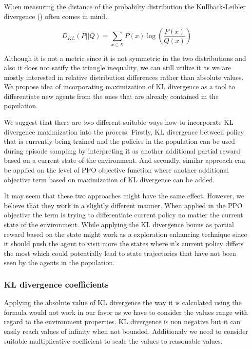 When measuring the distance of the probabilty distribution the Kullback-Leibler divergence (\cite{KLDivergence}) often comes in mind.

\[
    D_{KL}(P||Q) = \sum_{x \in X}P(x)\log\left(\frac{P(x)}{Q(x)}\right)
\]

Although it is not a metric since it is not symmetric in the two distributions and also it does not satify the triangle inequality, we can still utilize it as we are mostly interested in relative distribution differences rather than absolute values.
We propose idea of incorporating maximization of KL divergence as a tool to differentiate new agents from the ones that are already contained in the population.

We suggest that there are two different suitable ways how to incorporate KL divergence maximization into the process.
Firstly, KL divergence between policy that is currently being trained and the policies in the population can be used during episode sampling by interpreting it as another additional partial reward based on a current state of the environment.
And secondly, similar approach can be applied on the level of PPO objective function where another additional objective term based on maximization of KL divergence can be added.

It may seem that these two approaches might have the same effect.
However, we believe that they work in a slightly different manner.
When applied in the PPO objective the term is trying to differentiate current policy no matter the current state of the environment.
While applying the KL divergence bonus as partial reward based on the state might work as a exploration enhancing technique since it should push the agent to visit more the states where it's current policy differs the most which could potentially lead to state trajectories that have not been seen by the agents in the population.   

\subsubsection{KL divergence coefficients}
Applying the absolute value of KL divergence the way it is calculated using the formula would not work in our favor as we have to consider the values range with regard to the environment properties.
KL divergence is non negative but it can easily reach values of infinity when not bounded.
Additionaly we need to consider suitable multiplicative coefficient to scale the values to reasonable values.

